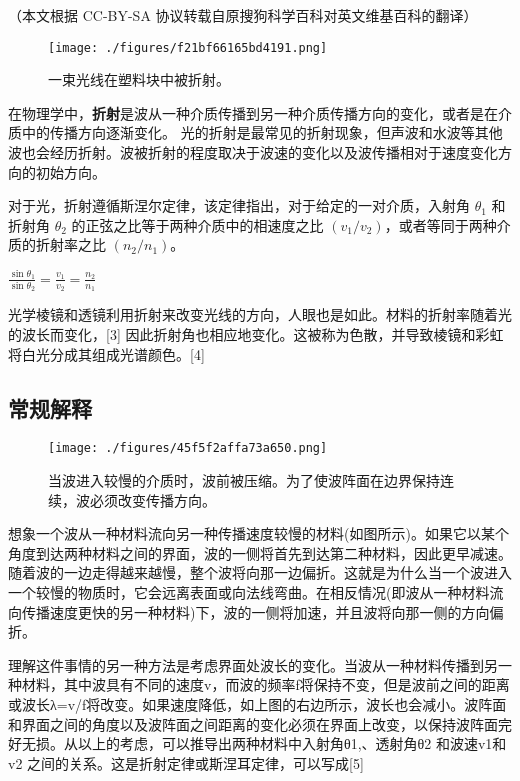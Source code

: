 
（本文根据 CC-BY-SA 协议转载自原搜狗科学百科对英文维基百科的翻译）

\begin{figure}[ht]
\centering
\texttt{[image: ./figures/f21bf66165bd4191.png]}
\caption{一束光线在塑料块中被折射。} \label{fig_ZS_1}
\end{figure}

在物理学中，\textbf{折射}是波从一种介质传播到另一种介质传播方向的变化，或者是在介质中的传播方向逐渐变化。 光的折射是最常见的折射现象，但声波和水波等其他波也会经历折射。波被折射的程度取决于波速的变化以及波传播相对于速度变化方向的初始方向。

对于光，折射遵循斯涅尔定律，该定律指出，对于给定的一对介质，入射角 $\theta_1$ 和折射角 $\theta_2$ 的正弦之比等于两种介质中的相速度之比 $(v_1 / v_2)$，或者等同于两种介质的折射率之比 $(n_2 / n_1)$。

$\frac{\sin \theta_1}{\sin \theta_2} = \frac{v_1}{v_2} = \frac{n_2}{n_1}$

光学棱镜和透镜利用折射来改变光线的方向，人眼也是如此。材料的折射率随着光的波长而变化，[3] 因此折射角也相应地变化。这被称为色散，并导致棱镜和彩虹将白光分成其组成光谱颜色。[4]

\subsection{常规解释}

\begin{figure}[ht]
\centering
\texttt{[image: ./figures/45f5f2affa73a650.png]}
\caption{当波进入较慢的介质时，波前被压缩。为了使波阵面在边界保持连续，波必须改变传播方向。} \label{fig_ZS_2}
\end{figure}

想象一个波从一种材料流向另一种传播速度较慢的材料(如图所示)。如果它以某个角度到达两种材料之间的界面，波的一侧将首先到达第二种材料，因此更早减速。随着波的一边走得越来越慢，整个波将向那一边偏折。这就是为什么当一个波进入一个较慢的物质时，它会远离表面或向法线弯曲。在相反情况(即波从一种材料流向传播速度更快的另一种材料)下，波的一侧将加速，并且波将向那一侧的方向偏折。

理解这件事情的另一种方法是考虑界面处波长的变化。当波从一种材料传播到另一种材料，其中波具有不同的速度v，而波的频率f将保持不变，但是波前之间的距离或波长λ=v/f将改变。如果速度降低，如上图的右边所示，波长也会减小。波阵面和界面之间的角度以及波阵面之间距离的变化必须在界面上改变，以保持波阵面完好无损。从以上的考虑，可以推导出两种材料中入射角θ1,、透射角θ2 和波速v1和v2 之间的关系。这是折射定律或斯涅耳定律，可以写成[5]


